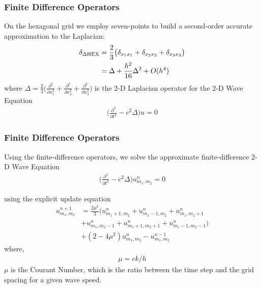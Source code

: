 \documentclass{beamer}
\begin{document}
\begin{frame}
\frametitle{Finite Difference Operators}
On the hexagonal grid we employ seven-points to build a second-order accurate approximation to the Laplacian:
\begin{align}
\delta_{\Delta \text{HEX}} &= \frac{2}{3} \big( \delta_{x_1 x_1} + \delta_{x_2 x_2} + \delta_{x_3 x_3}\big) \notag \\
&= \Delta + \frac{h^2}{16} \Delta^2 + O(h^4)
\end{align}
where $\Delta = \frac{2}{3}\big( \frac{\partial^2}{\partial x_1^2} + \frac{\partial^2}{\partial x_2^2} + \frac{\partial^2}{\partial x_3^2}\big)$ is the 2-D Laplacian operator for the 2-D Wave Equation
\begin{align}
\bigg(\frac{\partial^2}{\partial t^2} - c^2 \Delta \bigg) u = 0
\end{align}
\end{frame}
\begin{frame}
\frametitle{Finite Difference Operators}
Using the finite-difference operators, we solve the approximate finite-difference 2-D Wave Equation
\begin{align}
\bigg(\frac{\partial^2}{\partial t^2} - c^2 \Delta \bigg) u^{n}_{m_1,m_2} = 0
\end{align}

using the explicit update equation
\begin{align}
u^{n+1}_{m_1,m_2} &= \frac{2\mu^2 }{3} \big( u^{n}_{m_1+1,m_2} + u^{n}_{m_1-1,m_2} + u^{n}_{m_1,m_2+1} \\
&+ u^{n}_{m_1,m_2-1} + u^{n}_{m_1+1,m_2+1} + u^{n}_{m_1-1,m_2-1} \big) \\
&+ (2-4\mu^2) u^{n}_{m_1,m_2} - u^{n-1}_{m_1,m_2}
\end{align}
where, 
\begin{align}
\mu = ck/h \label{eq:CourantNumber}
\end{align}
$\mu$ is the Courant Number, which is the ratio between the time step and the grid spacing for a given wave speed. 
\end{frame}
\end{document}
